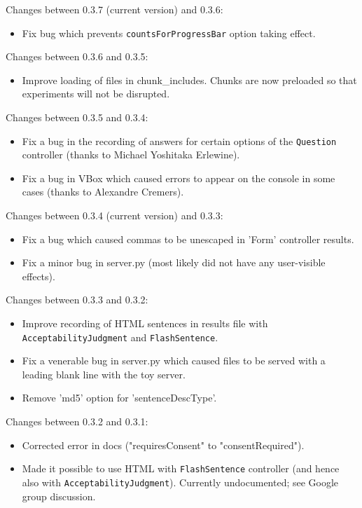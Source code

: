 \documentclass[
]{article}
\providecommand{\tightlist}{%
  \setlength{\itemsep}{0pt}\setlength{\parskip}{0pt}}
\begin{document}
Changes between 0.3.7 (current version) and 0.3.6:

\begin{itemize}
\tightlist
\item
  Fix bug which prevents \texttt{countsForProgressBar} option taking
  effect.
\end{itemize}

Changes between 0.3.6 and 0.3.5:

\begin{itemize}
\tightlist
\item
  Improve loading of files in chunk\_includes. Chunks are now preloaded
  so that experiments will not be disrupted.
\end{itemize}

Changes between 0.3.5 and 0.3.4:

\begin{itemize}
\tightlist
\item
  Fix a bug in the recording of answers for certain options of the
  \texttt{Question} controller (thanks to Michael Yoshitaka Erlewine).
\item
  Fix a bug in VBox which caused errors to appear on the console in some
  cases (thanks to Alexandre Cremers).
\end{itemize}

Changes between 0.3.4 (current version) and 0.3.3:

\begin{itemize}
\tightlist
\item
  Fix a bug which caused commas to be unescaped in 'Form' controller
  results.
\item
  Fix a minor bug in server.py (most likely did not have any
  user-visible effects).
\end{itemize}

Changes between 0.3.3 and 0.3.2:

\begin{itemize}
\tightlist
\item
  Improve recording of HTML sentences in results file with
  \texttt{AcceptabilityJudgment} and \texttt{FlashSentence}.
\item
  Fix a venerable bug in server.py which caused files to be served with
  a leading blank line with the toy server.
\item
  Remove 'md5' option for 'sentenceDescType'.
\end{itemize}

Changes between 0.3.2 and 0.3.1:

\begin{itemize}
\tightlist
\item
  Corrected error in docs ("requiresConsent" to "consentRequired").
\item
  Made it possible to use HTML with \texttt{FlashSentence} controller
  (and hence also with \texttt{AcceptabilityJudgment}). Currently
  undocumented; see Google group discussion.
\end{itemize}
\end{document}
